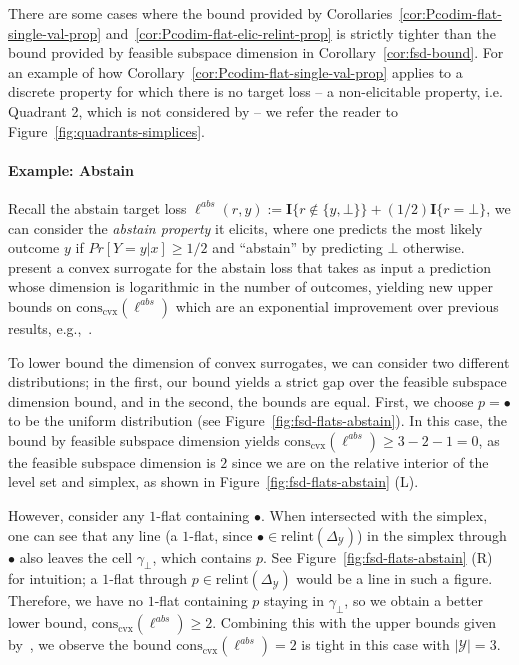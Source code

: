 \documentclass{article} %
\newcommand{\Comments}{0}
\newcommand{\mytodo}[2]{\ifnum\Comments=1%
	\todo[linecolor=#1!80!black,backgroundcolor=#1,bordercolor=#1!80!black]{#2}\fi}
\newcommand{\raft}[1]{\mytodo{green!20!white}{RF: #1}}
\newcommand{\jessiet}[1]{\mytodo{teal!20!white}{JF: #1}}
\newcommand{\simplex}{\Delta_\Y}
\newcommand{\relint}[1]{\mathrm{relint}(#1)}
\newcommand{\conscvx}{\mathrm{cons}_\mathrm{cvx}}
\newcommand{\Y}{\mathcal{Y}}
\newcommand{\Ind}[1]{\mathbf{I}\{{#1}\}}
\begin{document}
There are some cases where the bound provided by Corollaries~\ref{cor:Pcodim-flat-single-val-prop} and~\ref{cor:Pcodim-flat-elic-relint-prop} is strictly tighter than the bound provided by feasible subspace dimension in Corollary~\ref{cor:fsd-bound}.
For an example of how Corollary~\ref{cor:Pcodim-flat-single-val-prop} applies to a discrete property for which there is no target loss -- a non-elicitable property, i.e. Quadrant 2, which is not considered by \citet{ramaswamy2018consistent} -- we refer the reader to Figure~\ref{fig:quadrants-simplices}.

\paragraph{Example: Abstain}\label{subsec:examples-finite}
Recall the abstain target loss $\ell^{abs}(r,y) := \Ind{r \not \in \{y, \bot\}} + (1/2)\Ind{r = \bot}$,  we can consider the \emph{abstain property} it elicits, where one predicts the most likely outcome $y$ if $Pr[Y=y|x] \geq 1/2$ and ``abstain'' by predicting $\bot$ otherwise.
\citet{ramaswamy2016convex} present a convex surrogate for the abstain loss that takes as input a prediction whose dimension is logarithmic in the number of outcomes, yielding new upper bounds on $\conscvx(\ell^{abs})$ which are an exponential improvement over previous results, e.g.,~\cite{crammer2001algorithmic}.

To lower bound the dimension of convex surrogates, we can consider two different distributions; in the first, our bound yields a strict gap over the feasible subspace dimension bound, and in the second, the bounds are equal.
First, we choose $p = \bullet$ to be the uniform distribution (see Figure~\ref{fig:fsd-flats-abstain}).
In this case, the bound by feasible subspace dimension yields $\conscvx(\ell^{abs}) \geq 3 - 2 - 1 = 0$, as the feasible subspace dimension is $2$ since we are on the relative interior of the level set and simplex, as shown in Figure~\ref{fig:fsd-flats-abstain} (L).


However, consider any $1$-flat containing $\bullet$.
When intersected with the simplex, one can see that any line (a $1$-flat, since $\bullet \in \relint{\simplex}$) in the simplex through $\bullet$ also leaves the cell $\gamma_\bot$, which contains $p$.
See Figure~\ref{fig:fsd-flats-abstain} (R) for intuition; a $1$-flat through $p \in \relint{\simplex}$ would be a line in such a figure.
Therefore, we have no $1$-flat containing $p$ staying in $\gamma_\bot$, so we obtain a better lower bound, $\conscvx(\ell^{abs}) \geq 2$.
Combining this with the upper bounds given by~\cite{ramaswamy2018consistent}, we observe the bound $\conscvx(\ell^{abs}) = 2$ is tight in this case with $|\Y|=3$.
\end{document}
